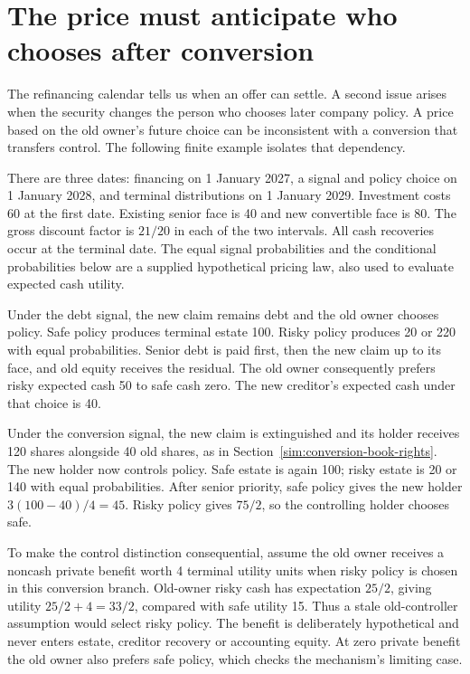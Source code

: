 
\section{The price must anticipate who chooses after conversion}
\label{sim:two-date-control-price}
The refinancing calendar tells us when an offer can settle. A second issue
arises when the security changes the person who chooses later company
policy. A price based on the old owner's future choice can be inconsistent
with a conversion that transfers control. The following finite example
isolates that dependency.

There are three dates: financing on 1 January 2027, a signal and policy
choice on 1 January 2028, and terminal distributions on 1 January 2029.
Investment costs 60 at the first date. Existing senior face is 40 and new
convertible face is 80. The gross discount factor is $21/20$ in each of the
two intervals. All cash recoveries occur at the terminal date. The equal
signal probabilities and the conditional probabilities below are a supplied
hypothetical pricing law, also used to evaluate expected cash utility.

Under the debt signal, the new claim remains debt and the old owner
chooses policy. Safe policy produces terminal estate 100. Risky policy
produces 20 or 220 with equal probabilities. Senior debt is paid first,
then the new claim up to its face, and old equity receives the residual.
The old owner consequently prefers risky expected cash 50 to safe cash
zero. The new creditor's expected cash under that choice is 40.

Under the conversion signal, the new claim is extinguished and its holder
receives 120 shares alongside 40 old shares, as in
Section~\ref{sim:conversion-book-rights}. The new holder now controls
policy. Safe estate is again 100; risky estate is 20 or 140 with equal
probabilities. After senior priority, safe policy gives the new holder
$3(100-40)/4=45$. Risky policy gives $75/2$, so the controlling holder
chooses safe.

To make the control distinction consequential, assume the old owner
receives a noncash private benefit worth 4 terminal utility units when
risky policy is chosen in this conversion branch. Old-owner risky cash
has expectation $25/2$, giving utility $25/2+4=33/2$, compared with safe
utility 15. Thus a stale old-controller assumption would select risky
policy. The benefit is deliberately hypothetical and never enters estate,
creditor recovery or accounting equity. At zero private benefit the old
owner also prefers safe policy, which checks the mechanism's limiting case.

